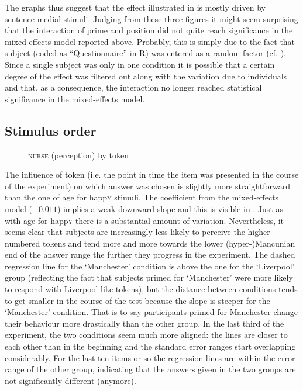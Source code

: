 The graphs thus suggest that the  effect illustrated in  is mostly driven by sentence-medial stimuli.
Judging from these three figures it might seem surprising that the interaction of prime and position did not quite reach significance in the mixed-effects model reported above.
Probably, this is simply due to the fact that subject (coded as ``Questionnaire'' in R) was entered as a random factor (cf. ).
Since a single subject was only in one  condition it is possible that a certain degree of the  effect was filtered out along with the variation due to individuals and that, as a consequence, the interaction no longer reached statistical significance in the mixed-effects model.

\subsection{Stimulus order}
\label{sec.perc_res.nurse.order}

\begin{figure}
	
		\resizebox{.49\linewidth}{!}{} 
	\caption{\textsc{nurse} (perception) by token}
	\label{fig.scatter.nurse.ext.token}
\end{figure}

The influence of token (i.e. the point in time the item was presented in the course of the experiment) on which answer was chosen is slightly more straightforward than the one of age for happ\textsc{y} stimuli.
The coefficient from the mixed-effects model (\ensuremath{-0.011}) implies a weak downward slope and this is visible in .
Just as with age for happ\textsc{y} there is a substantial amount of variation.
Nevertheless, it seems clear that subjects are increasingly less likely to perceive the higher-numbered tokens and tend more and more towards the lower (hyper-)Mancunian end of the answer range the further they progress in the experiment.
The dashed regression line for the `Manchester'  condition is above the one for the `Liverpool' group (reflecting the fact that subjects primed for `Manchester' were more likely to respond with Liverpool-like tokens), but the distance between conditions tends to get smaller in the course of the test because the slope is steeper for the `Manchester' condition. That is to say participants primed for Manchester change their behaviour more drastically than the other group.
In the last third of the experiment, the two conditions seem much more aligned: the lines are closer to each other than in the beginning and the standard error ranges start overlapping considerably.
For the last ten items or so the regression lines are within the error range of the other group, indicating that the answers given in the two groups are not significantly different (anymore).

